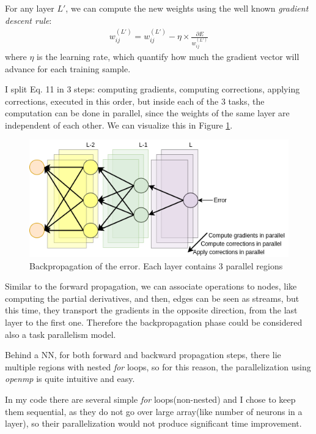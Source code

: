 \documentclass{article}
\begin{document}
For any layer $L'$, we can compute the new weights using the well known \textit{gradient descent rule}:
\begin{eqnarray}
	w^{(L')}_{ij} = 	w^{(L')}_{ij} - \eta \times \frac{\partial E}{w^{(L')}_{ij}}
\end{eqnarray}
where $\eta$ is the learning rate, which quantify how much the gradient vector will advance for each training sample.

I split Eq. 11 in 3 steps: computing gradients, computing corrections, applying corrections, executed in this order, but inside each of the 3 tasks, the computation can be done in parallel, since the weights of the same layer are independent of each other. We can visualize this in Figure \ref{fig:back}.

\begin{figure}[htbp]
	\centering
	\includegraphics[scale=0.6]{fig/back_2.png}
	\caption{Backpropagation of the error. Each layer contains 3 parallel regions}
	\label{fig:back}
\end{figure}

\newpage

Similar to the forward propagation, we can associate operations to nodes, like computing the partial derivatives, and then, edges can be seen as streams, but this time, they transport the gradients in the opposite direction, from the last layer to the first one. Therefore the backpropagation phase could be considered also a task parallelism model.

Behind a NN, for both forward and backward propagation steps, there lie multiple regions with nested \textit{for} loops, so for this reason, the parallelization using \textit{openmp} is quite intuitive and easy.

In my code there are several simple \textit{for} loops(non-nested) and I chose to keep them sequential, as they do not go over large array(like number of neurons in a layer), so their parallelization would not produce significant time improvement.
\end{document}
